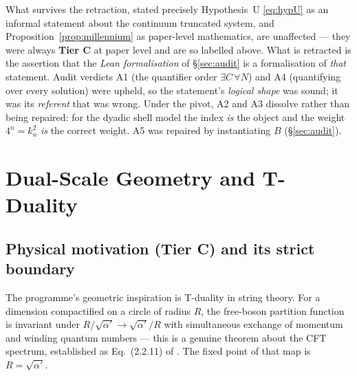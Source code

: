 \documentclass[11pt,a4paper]{article}
\newcommand{\tC}{\textcolor{TierC}{\textbf{Tier C}}}
\theoremstyle{definition}
\theoremstyle{plain}
\begin{document}
\begin{keybox}{What survives the retraction, stated precisely}
Hypothesis~U \eqref{eq:hypU} as an informal statement about the continuum truncated system, and
Proposition~\ref{prop:millennium} as paper-level mathematics, are unaffected --- they were always \tC{} at paper
level and are so labelled above. What is retracted is the assertion that the \emph{Lean
formalisation} of \S\ref{sec:audit} is a formalisation of \emph{that} statement. Audit verdicts
A1 (the quantifier order $\exists C\,\forall N$) and A4 (quantifying over every solution) were
upheld, so the statement's \emph{logical shape} was sound; it was its \emph{referent} that was
wrong. Under the pivot, A2 and A3 dissolve rather than being repaired: for the dyadic shell
model the index \emph{is} the object and the weight $4^n=k_n^2$ \emph{is} the correct weight.
A5 was repaired by instantiating $B$ (\S\ref{sec:audit}).
\end{keybox}

\section{Dual-Scale Geometry and T-Duality}
\label{sec:tdual}

\subsection{Physical motivation (\tC{}) and its strict boundary}

The programme's geometric inspiration is T-duality in string theory. For a dimension
compactified on a circle of radius $R$, the free-boson partition function is invariant under
$R/\sqrt{\alpha'}\to\sqrt{\alpha'}/R$ with simultaneous exchange of momentum and winding
quantum numbers --- this is a genuine theorem about the CFT spectrum, established as
Eq.~(2.2.11) of \cite{giveon-porrati-rabinovici}. The fixed point of that map is
$R=\sqrt{\alpha'}$.
\end{document}
